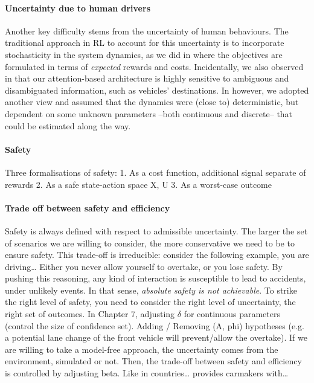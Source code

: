 \paragraph{Uncertainty due to human drivers}
Another key difficulty stems from the uncertainty of human behaviours. The traditional approach in \gls{RL} to account for this uncertainty is to incorporate stochasticity in the system dynamics, as we did in  where the objectives are formulated in terms of \emph{expected} rewards and costs. Incidentally, we also observed in  that our attention-based architecture is highly sensitive to ambiguous and disambiguated information, such as vehicles' destinations. In  however, we adopted another view and assumed that the dynamics were (close to) deterministic, but dependent on some unknown parameters --both continuous and discrete-- that could be estimated along the way.

\paragraph{Safety}
Three formalisations of safety:
1.	As a cost function, additional signal separate of rewards
2.	As a safe state-action space X, U
3.	As a worst-case outcome

\paragraph{Trade off between safety and efficiency}
Safety is always defined with respect to admissible uncertainty. The larger the set of scenarios we are willing to consider, the more conservative we need to be to ensure safety.
This trade-off is irreducible: consider the following example, you are driving…
Either you never allow yourself to overtake, or you lose safety. 
By pushing this reasoning, any kind of interaction is susceptible to lead to accidents, under unlikely events.
In that sense, \emph{absolute safety is not achievable}. To strike the right level of safety, you need to consider the right level of uncertainty, the right set of outcomes.
In Chapter 7, adjusting $\delta$ for continuous parameters (control the size of confidence set).
Adding / Removing (A, phi) hypotheses (e.g. a potential lane change of the front vehicle will prevent/allow the overtake).
If we are willing to take a model-free approach, the uncertainty comes from the environment, simulated or not. Then, the trade-off between safety and efficiency is controlled by adjusting beta. Like in countries… provides carmakers with…

